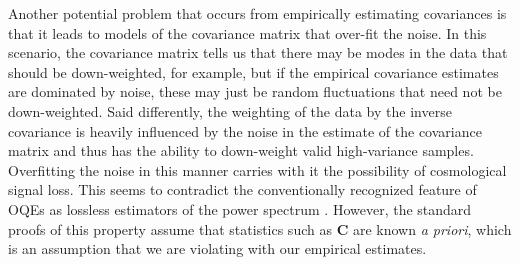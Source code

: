 \documentclass[twocolumn,numberedappendix]{emulateapj} \shorttitle{PSA64}
\begin{document}
Another potential problem that occurs from empirically estimating covariances is that it
leads to models of the covariance matrix that over-fit the noise. In this
scenario, the covariance matrix tells us that there may be modes in the data
that should be down-weighted, for example, but if the empirical covariance estimates are dominated
by noise, these may just be random fluctuations that need not be down-weighted. Said differently, the weighting of the data by the inverse
covariance is heavily influenced by the noise in the estimate of the covariance
matrix and thus has the ability to down-weight valid high-variance samples. 
Overfitting the noise in this manner carries with it the possibility of cosmological signal loss.
This seems to contradict the conventionally recognized feature of OQEs as
lossless estimators of the power spectrum \citep{tegmark1997}. However,
the standard proofs of this property assume that statistics such as $\mathbf{C}$
are known \emph{a priori}, which is an assumption that we are violating with our
empirical estimates.
%
%


\end{document}
